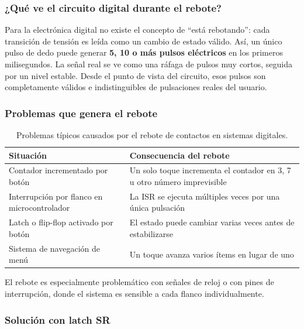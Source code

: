 
\subsubsection*{¿Qué ve el circuito digital durante el rebote?}

Para la electrónica digital no existe el concepto de ``está rebotando'': cada transición de tensión es leída como un cambio de estado válido. Así, un único pulso de dedo puede generar \textbf{5, 10 o más pulsos eléctricos} en los primeros milisegundos. La señal real se ve como una ráfaga de pulsos muy cortos, seguida por un nivel estable. Desde el punto de vista del circuito, esos pulsos son completamente válidos e indistinguibles de pulsaciones reales del usuario.

\subsubsection*{Problemas que genera el rebote}

\begin{table}[H]
\centering
\begin{tabular}{p{5.5cm} p{7cm}}
\toprule
\textbf{Situación} & \textbf{Consecuencia del rebote} \\
\midrule
Contador incrementado por botón & Un solo toque incrementa el contador en 3, 7 u otro número imprevisible \\
\addlinespace
Interrupción por flanco en microcontrolador & La ISR se ejecuta múltiples veces por una única pulsación \\
\addlinespace
Latch o flip-flop activado por botón & El estado puede cambiar varias veces antes de estabilizarse \\
\addlinespace
Sistema de navegación de menú & Un toque avanza varios ítems en lugar de uno \\
\bottomrule
\end{tabular}
\caption{Problemas típicos causados por el rebote de contactos en sistemas digitales.}
\end{table}

El rebote es especialmente problemático con señales de reloj o con pines de interrupción, donde el sistema es sensible a cada flanco individualmente.

\subsubsection*{Solución con latch SR}

